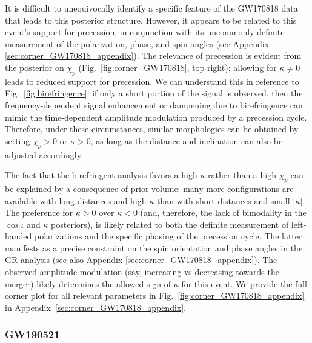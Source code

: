 \documentclass[aps,prd,twocolumn,superscriptaddress,preprintnumbers,nofootinbib]{revtex4-2}
\begin{document}
It is difficult to unequivocally identify a specific feature of the GW170818 data that leads to this posterior structure.
However, it appears to be related to this event's support for precession, in conjunction with its uncommonly definite measurement of the polarization, phase, and spin angles \cite{Varma:2021csh} (see Appendix \ref{sec:corner_GW170818_appendix}).
The relevance of precession is evident from the posterior on $\chi_p$ (Fig.~\ref{fig:corner_GW170818}, top right): allowing for $\kappa \neq 0$ leads to reduced support for precession.
We can understand this in reference to Fig.~\ref{fig:birefringence}: if only a short portion of the signal is observed, then the frequency-dependent signal enhancement or dampening due to birefringence can mimic the time-dependent amplitude modulation produced by a precession cycle.
Therefore, under these circumstances, similar morphologies can be obtained by setting $\chi_p > 0$ or $\kappa > 0$, as long as the distance and inclination can also be adjusted accordingly.

The fact that the birefringent analysis favors a high $\kappa$ rather than a high $\chi_p$ can be explained by a consequence of prior volume: many more configurations are available with long distances and high $\kappa$ than with short distances and small $|\kappa|$.
The preference for $\kappa > 0$ over $\kappa < 0$ (and, therefore, the lack of bimodality in the $\cos\iota$ and $\kappa$ posteriors), is likely related to both the definite measurement of left-handed polarizations and the specific phasing of the precession cycle.
The latter manifests as a precise constraint on the spin orientation and phase angles in the \ac{GR} analysis \cite{Varma:2021csh} (see also Appendix \ref{sec:corner_GW170818_appendix}).
The observed amplitude modulation (say, increasing vs decreasing towards the merger) likely determines the allowed sign of $\kappa$ for this event.
We provide the full corner plot for all relevant parameters in Fig.~\ref{fig:corner_GW170818_appendix} in Appendix~\ref{sec:corner_GW170818_appendix}.

\subsubsection{GW190521}
\label{sec:GW190521}
\end{document}
